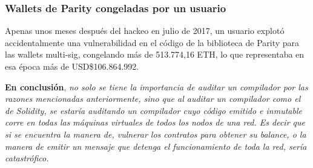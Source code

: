 \subsubsection{Wallets de Parity congeladas por un usuario}
Apenas unos meses después del hackeo en julio de 2017, un usuario explotó accidentalmente una vulnerabilidad en el código de la biblioteca de Parity para las wallets multi-sig, congelando más de 513.774,16 ETH, lo que representaba en esa época más de USD\$106.864.992\cite{parityfreeze}.\newline

\textbf{En conclusión},\textit{ no solo se tiene la importancia de auditar un compilador por las razones mencionadas anteriormente, sino que al auditar un compilador como el de Solidity, se estaría auditando un compilador cuyo código emitido e inmutable corre en todas las máquinas virtuales de todos los nodos de una red. Es decir que si se encuentra la manera de, vulnerar los contratos para obtener su balance, o la manera de emitir un mensaje que detenga el funcionamiento de toda la red, sería catastrófico.}
